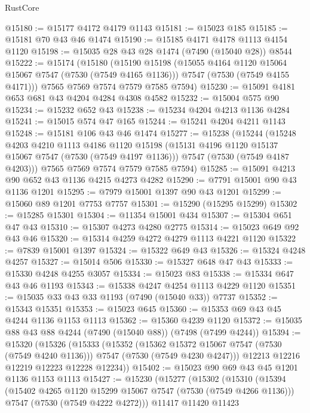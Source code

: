 \begin{lexlean}{RustCore}
\begin{coremodule}
@15180 := @15177 @4172 @4179 @1143
@15181 := @15023 @185
@15185 := @15181 @70 @43 @46 @1474
@15190 := @15185 @4171 @4178 @1113 @4154 @1120
@15198 := @15035 @28 @43 @28 @1474 (@7490 (@15040 @28)) @8544
@15222 := @15174
    (@15180
      (@15190
        @15198
        (@15055 @4164 @1120 @15064 @15067 @7547 (@7530 (@7549 @4165 @1136)))
        @7547
        (@7530 (@7549 @4155 @4171)))
      @7565
      @7569
      @7574
      @7579
      @7585
      @7594)
@15230 := @15091 @4181 @653 @681 @43 @4204 @4284 @4308 @4582
@15232 := @15004 @575 @90
@15234 := @15232 @652 @43
@15238 := @15234 @4204 @4213 @1136 @4284
@15241 := @15015 @574 @47 @165
@15244 := @15241 @4204 @4211 @1143
@15248 := @15181 @106 @43 @46 @1474
@15277 := @15238
    (@15244
      (@15248
        @4203
        @4210
        @1113
        @4186
        @1120
        @15198
        (@15131 @4196 @1120 @15137 @15067 @7547 (@7530 (@7549 @4197 @1136)))
        @7547
        (@7530 (@7549 @4187 @4203)))
      @7565
      @7569
      @7574
      @7579
      @7585
      @7594)
@15285 := @15091 @4213 @90 @652 @43 @1136 @4215 @4273 @4282
@15290 := @7791 @15001 @90 @43 @1136 @1201
@15295 := @7979 @15001 @1397 @90 @43 @1201
@15299 := @15060 @89 @1201 @7753 @7757
@15301 := @15290 (@15295 @15299)
@15302 := @15285 @15301
@15304 := @11354 @15001 @434
@15307 := @15304 @651 @47 @43
@15310 := @15307 @4273 @4280 @2775
@15314 := @15023 @649 @92 @43 @46
@15320 := @15314 @4259 @4272 @4279 @1113 @4221 @1120
@15322 := @7839 @15001 @1397
@15324 := @15322 @649 @43
@15326 := @15324 @4248 @4257
@15327 := @15014 @506
@15330 := @15327 @648 @47 @43
@15333 := @15330 @4248 @4255 @3057
@15334 := @15023 @83
@15338 := @15334 @647 @43 @46 @1193
@15343 := @15338 @4247 @4254 @1113 @4229 @1120
@15351 := @15035 @33 @43 @33 @1193 (@7490 (@15040 @33)) @7737
@15352 := @15343 @15351
@15353 := @15023 @645
@15360 := @15353 @69 @43 @45 @4244 @1136 @1153 @1113
@15362 := @15360 @4239 @1120
@15372 := @15035 @88 @43 @88 @4244 (@7490 (@15040 @88)) (@7498 (@7499 @4244))
@15394 := @15320
    (@15326
      (@15333
        (@15352
          (@15362 @15372 @15067 @7547 (@7530 (@7549 @4240 @1136)))
          @7547
          (@7530 (@7549 @4230 @4247)))
        @12213
        @12216
        @12219
        @12223
        @12228
        @12234))
@15402 := @15023 @90 @69 @43 @45 @1201 @1136 @1153 @1113
@15427 := @15230
    (@15277
      (@15302
        (@15310
          (@15394
            (@15402 @4265 @1120 @15299 @15067 @7547 (@7530 (@7549 @4266 @1136)))
            @7547
            (@7530 (@7549 @4222 @4272)))
          @11417
          @11420
          @11423

\end{coremodule}
\end{lexlean}
